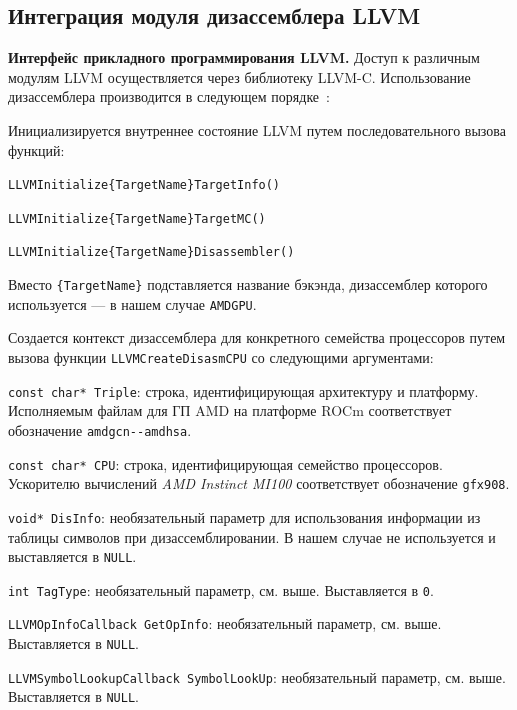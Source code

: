 \documentclass[a4paper,14pt]{extarticle}
\newcommand{\topic}[1]{\textbf{#1.}}
\begin{document}
{\begin{ol}
\end{ol}

\subsection{Интеграция модуля дизассемблера LLVM}
\label{section:impl-disasm}

\topic{Интерфейс прикладного программирования LLVM} Доступ к различным модулям LLVM
осуществляется через библиотеку LLVM-C. Использование дизассемблера производится
в следующем порядке~\cite{llvm-c}:
\begin{ol}
\item Инициализируется внутреннее состояние LLVM путем последовательного
вызова функций:
  \begin{ol}
  \item \verb|LLVMInitialize{TargetName}TargetInfo()|
  \item \verb|LLVMInitialize{TargetName}TargetMC()|
  \item \verb|LLVMInitialize{TargetName}Disassembler()|
  \end{ol}
Вместо \verb|{TargetName}| подставляется название бэкэнда, дизассемблер которого
используется — в нашем случае \verb|AMDGPU|.

\item Создается контекст дизассемблера для конкретного семейства процессоров
путем вызова функции \verb|LLVMCreateDisasmCPU| со следующими аргументами:
  \begin{ol}
  \item \verb|const char* Triple|: строка, идентифицирующая архитектуру и платформу.
Исполняемым файлам для ГП AMD на платформе ROCm соответствует обозначение \verb|amdgcn--amdhsa|.
  \item \verb|const char* CPU|: строка, идентифицирующая семейство процессоров.
Ускорителю вычислений \textit{AMD Instinct MI100} соответствует обозначение \verb|gfx908|.
  \item \verb|void* DisInfo|: необязательный параметр для использования информации из таблицы
символов при дизассемблировании. В нашем случае не используется и выставляется в \verb|NULL|.
  \item \verb|int TagType|: необязательный параметр, см. выше. Выставляется в \verb|0|.
  \item \verb|LLVMOpInfoCallback GetOpInfo|: необязательный параметр, см. выше. Выставляется в \verb|NULL|.
  \item \verb|LLVMSymbolLookupCallback SymbolLookUp|: необязательный параметр, см. выше. Выставляется в \verb|NULL|. 
  \end{ol}


\end{ol}}
\end{document}
